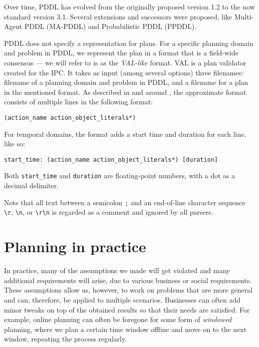 Over time, PDDL has evolved from the originally proposed version 1.2
to the now standard version 3.1. Several extensions and successors were proposed,
like Multi-Agent PDDL
(MA-PDDL) and
Probabilistic PDDL
(PPDDL).

PDDL does not specify a representation for plans. For a specific planning domain and problem in PDDL,
we represent the plan in a format that is a field-wide consensus --- we will refer to is
as the \textit{VAL-like} format. VAL \citep{Howey2003} is a plan validator created for the IPC.
It takes as input (among several options) three filenames: filename of a planning domain and
problem in PDDL, and a filename for a plan in the mentioned format.
As described in and around \citet[Figure~2]{Howey2003}, the approximate format
consists of multiple lines in the following format:
\begin{center}
\verb+(action_name action_object_literals*)+
\end{center}

For temporal domains, the format adds a start time and duration for each line, like so:
\begin{center}
\verb+start_time: (action_name action_object_literals*) [duration]+
\end{center}
Both \verb+start_time+ and \verb+duration+ are floating-point numbers, with a dot as a decimal delimiter.

Note that all text between a semicolon \verb+;+ and an end-of-line character sequence \verb+\r+, \verb+\n+, or \verb+\r\n+ is regarded as a comment and ignored by all parsers.







\section{Planning in practice}

In practice, many of the assumptions we made will get violated and many additional requirements will arise,
due to various business or social requirements.
These assumptions allow us, however, to work
on problems that are more general and can, therefore, be applied to multiple scenarios.
Businesses can often add minor tweaks on top of the obtained results so that
their needs are satisfied. 
For example, online planning can often be foregone for some form of \textit{windowed} planning,
where we plan a certain time window offline and move on to the next window,
repeating the process regularly.

